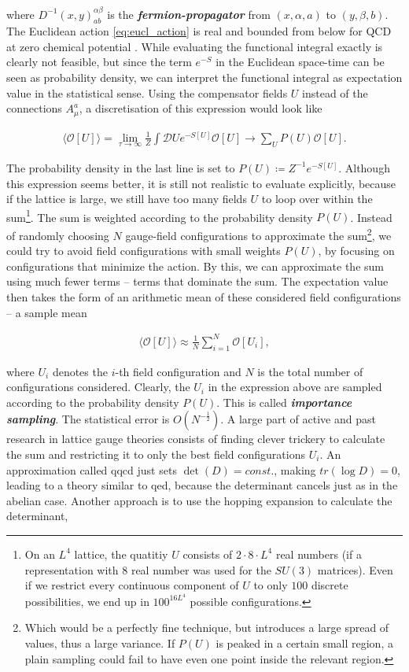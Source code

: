 \documentclass{article}
\theoremstyle{plain} %
\theoremstyle{convention} %
\theoremstyle{remark} %
\def\df#1{\textbf{\textit{#1}}}
\numberwithin{equation}{section}
\begin{document}
where $D^{-1}(x,y)^{\alpha \beta}_{a b}$ is the \df{fermion-propagator} from $(x,\alpha,a)$ to $(y,\beta,b)$. The Euclidean action \eqref{eq:eucl_action} is real and bounded from below for QCD at zero chemical potential \cite{gupta1998}. While evaluating the functional integral exactly is clearly not feasible, but since the term $e^{-S}$ in the Euclidean space-time can be seen as probability density, we can interpret the functional integral as expectation value in the statistical sense. Using the compensator fields $U$ instead of the connections $A_{\mu}^a$, a discretisation of this expression would look like

\begin{align*}
    \langle \mathcal{O}[U] \rangle = \lim_{\tau \to \infty} \frac{1}{Z} \int \mathcal{D} U e^{-S[U]} \mathcal{O}[U] \longrightarrow \sum_U P(U) \mathcal{O}[U].
\end{align*}

The probability density in the last line is set to $P(U) \coloneqq Z^{-1} e^{-S[U]}$. Although this expression seems better, it is still not realistic to evaluate explicitly, because if the lattice is large, we still have too many fields $U$ to loop over within the sum\footnote{On an $L^4$ lattice, the quatitiy $U$ consists of $2 \cdot 8 \cdot L^4$ real numbers (if a representation with $8$ real number was used for the $SU(3)$ matrices). Even if we restrict every continuous component of $U$ to only $100$ discrete possibilities, we end up in $100^{16 L^4}$ possible configurations.}. The sum is weighted according to the probability density $P(U)$. Instead of randomly choosing $N$ gauge-field configurations to approximate the sum\footnote{Which would be a perfectly fine technique, but introduces a large spread of values, thus a large variance. If $P(U)$ is peaked in a certain small region, a plain sampling could fail to have even one point inside the relevant region.}, we could try to avoid field configurations with small weights $P(U)$, by focusing on configurations that minimize the action. By this, we can approximate the sum using much fewer terms -- terms that dominate the sum. The expectation value then takes the form of an arithmetic mean of these considered field configurations -- a sample mean

\begin{align}
    \langle \mathcal{O}[U] \rangle \approx \frac{1}{N} \sum_{i=1}^N \mathcal{O}[U_i], \label{eq:sample_mean}
\end{align}

where $U_i$ denotes the $i$-th field configuration and $N$ is the total number of configurations considered. Clearly, the $U_i$ in the expression above are sampled according to the probability density $P(U)$. This is called \df{importance sampling}. The statistical error is $O(N^{-\frac{1}{2}})$. A large part of active and past research in lattice gauge theories consists of finding clever trickery to calculate the sum and restricting it to only the best field configurations $U_i$. An approximation called \acrfull{qqcd} just sets $\det(D) = const.$, making $tr(\log D) = 0$, leading to a theory similar to \acrshort{qed}, because the determinant cancels just as in the abelian case. Another approach is to use the hopping expansion to calculate the determinant,
\end{document}
